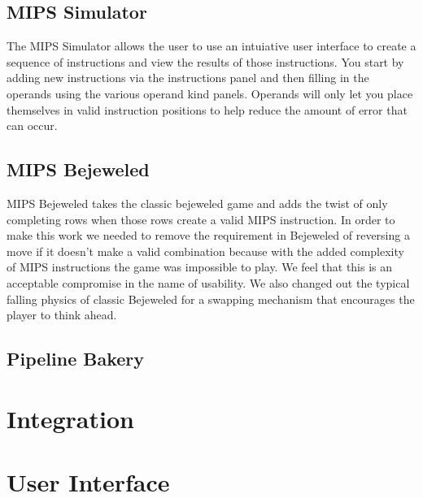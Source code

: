 \documentclass[12pt]{article}
\begin{document}
	\subsection{MIPS Simulator}
	The MIPS Simulator allows the user to use an intuiative user interface to create a sequence of instructions and view the results of those instructions. You start by adding new instructions via the instructions panel and then filling in the operands using the various operand kind panels. Operands will only let you place themselves in valid instruction positions to help reduce the amount of error that can occur.
	\subsection{MIPS Bejeweled}
	MIPS Bejeweled takes the classic bejeweled game and adds the twist of only completing rows when those rows create a valid MIPS instruction. In order to make this work we needed to remove the requirement in Bejeweled of reversing a move if it doesn't make a valid combination because with the added complexity of MIPS instructions the game was impossible to play. We feel that this is an acceptable compromise in the name of usability. We also changed out the typical falling physics of classic Bejeweled for a swapping mechanism that encourages the player to think ahead.
	\subsection{Pipeline Bakery}
	\section{Integration}
	\section{User Interface}
\end{document}
